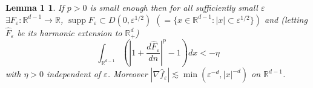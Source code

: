 \documentclass[11pt,reqno]{amsart}
\newtheorem*{lemA}{Lemma 1}
\newcommand{\Rd}{\mathbb{R}^d_+}
\newcommand{\Rdm}{\mathbb{R}^{d-1}}
\newcommand{\dn}[1]{\frac{d#1}{dn}}
\newcommand{\he}[1]{\widehat{#1}}          %
\DeclareMathOperator{\supp}{supp}
\begin{document}
\begin{lemA}
If $p>0$ is small enough then for all sufficiently small $\varepsilon$
$\exists F_\varepsilon:\Rdm\to\mathbb{R}$, $\supp F_\varepsilon\subset
D(0,\varepsilon^{1/2})$ $(=\{x\in\Rdm : |x|\subset\varepsilon^{1/2}\})$
and (letting $\he{F}_\varepsilon$ be its harmonic extension to $\Rd$)
\begin{equation*}
  \int_{\Rdm}\left(\left|1+\dn{\he{F}_\varepsilon}\right|^{p}-1\right)dx < -\eta
\end{equation*}
with $\eta>0$ independent of $\varepsilon$.  Moreover
$|\nabla \he{f}_\varepsilon| \lesssim \min(\varepsilon^{-d},|x|^{-d})$ on $\Rdm$.
\end{lemA}
\end{document}
